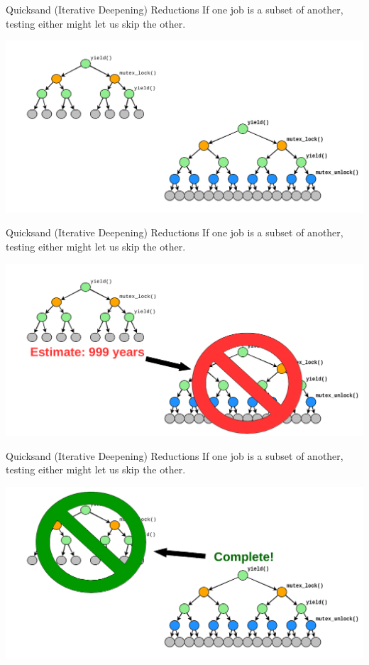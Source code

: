 \documentclass[xcolor=dvipsnames]{beamer}
\begin{document}
\begin{frame}{Quicksand (Iterative Deepening) Reductions}
	If one job is a subset of another, testing either might let us skip the other.
	\begin{center}
		\includegraphics[width=\textwidth]{../../oopsla/reduction-nothing.png}
	\end{center}
\end{frame}
\begin{frame}{Quicksand (Iterative Deepening) Reductions}
	If one job is a subset of another, testing either might let us skip the other.
	\begin{center}
		\includegraphics[width=\textwidth]{../../oopsla/reduction-deferred.png}
	\end{center}
\end{frame}
\begin{frame}{Quicksand (Iterative Deepening) Reductions}
	If one job is a subset of another, testing either might let us skip the other.
	\begin{center}
		\includegraphics[width=\textwidth]{../../oopsla/reduction-complete.png}
	\end{center}
\end{frame}
\end{document}
